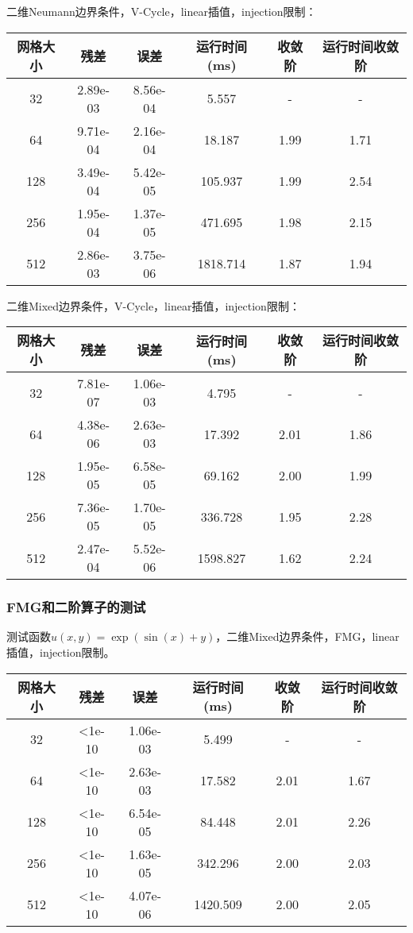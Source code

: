 \documentclass[lang=cn,a4paper,newtx,bibend=bibtex]{elegantpaper}
\begin{document}
二维Neumann边界条件，V-Cycle，linear插值，injection限制：

\begin{longtable}{|c|ccccc|} \hline
网格大小 & 残差 & 误差 & 运行时间(ms) & 收敛阶 & 运行时间收敛阶 \\ \hline
32 	& 2.89e-03	& 8.56e-04	& 5.557  & - & - \\ \hline
64 	& 9.71e-04	& 2.16e-04	& 18.187  & 1.99 & 1.71 \\ \hline
128	& 3.49e-04	& 5.42e-05	& 105.937 & 1.99 & 2.54 \\ \hline
256	& 1.95e-04	& 1.37e-05	& 471.695 & 1.98 & 2.15 \\ \hline
512	& 2.86e-03	& 3.75e-06	& 1818.714 & 1.87 & 1.94 \\ \hline
\end{longtable}

二维Mixed边界条件，V-Cycle，linear插值，injection限制：

\begin{longtable}{|c|ccccc|} \hline
网格大小 & 残差 & 误差 & 运行时间(ms) & 收敛阶 & 运行时间收敛阶 \\ \hline
32 	& 7.81e-07	& 1.06e-03	& 4.795  & - & - \\ \hline
64 	& 4.38e-06	& 2.63e-03	& 17.392  & 2.01 & 1.86 \\ \hline
128	& 1.95e-05	& 6.58e-05	& 69.162 & 2.00 & 1.99 \\ \hline
256	& 7.36e-05	& 1.70e-05	& 336.728 & 1.95 & 2.28 \\ \hline
512	& 2.47e-04	& 5.52e-06	& 1598.827 & 1.62 & 2.24 \\ \hline
\end{longtable}

\subsubsection{FMG和二阶算子的测试}

测试函数$u(x,y)=\exp(\sin(x)+y)$，二维Mixed边界条件，FMG，linear插值，injection限制。

\begin{longtable}{|c|ccccc|} \hline
网格大小 & 残差 & 误差 & 运行时间(ms) & 收敛阶 & 运行时间收敛阶 \\ \hline
32 	& <1e-10	& 1.06e-03	& 5.499  & - & - \\ \hline
64 	& <1e-10	& 2.63e-03	& 17.582  & 2.01 & 1.67 \\ \hline
128	& <1e-10	& 6.54e-05	& 84.448 & 2.01 & 2.26  \\ \hline
256	& <1e-10	& 1.63e-05	& 342.296 & 2.00 & 2.03  \\ \hline
512	& <1e-10	& 4.07e-06	& 1420.509 & 2.00 & 2.05  \\ \hline
\end{longtable}
\end{document}
